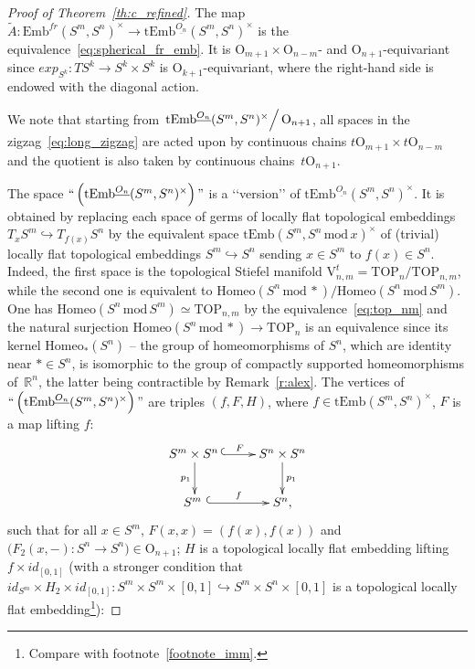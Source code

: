 \documentclass[11pt]{amsart}
\theoremstyle{definition}
\newcommand{\R}{{\mathbb R}}
\newcommand{\Embfr}{\mathrm{Emb}^{fr}}
\newcommand{\tEmb}{\mathrm{tEmb}}
\newcommand{\Homeo}{\mathrm{Homeo}}
\newcommand{\TOP}{\mathrm{TOP}}
\newcommand{\OO}{\mathrm{O}}
\newcommand{\VV}{\mathrm{V}}
\newcommand{\mmod}{\,\mathrm{mod}\,}
\numberwithin{equation}{section}
\begin{document}
\begin{proof}[Proof of Theorem~\ref{th:c_refined}]
The map $\tilde A\colon \Embfr(S^m,S^n)^\times\to \tEmb^{\underline{O_n}}(S^m,S^n)^\times$ is the equivalence~\eqref{eq:spherical_fr_emb}. It is $\OO_{m+1}\times\OO_{n-m}$- and $\OO_{n+1}$-equivariant since
$exp_{S^k}\colon TS^k\to S^k\times S^k$ is $\OO_{k+1}$-equivariant, where the right-hand side is endowed with the diagonal action. 

We note that starting from $\left.\tEmb^{\underline{O_n}}(S^m,S^n)^\times\right/\OO_{n+1}$, all spaces in the zigzag~\eqref{eq:long_zigzag} are acted upon by continuous chains $t\OO_{m+1}\times t\OO_{n-m}$ and the quotient is also 
taken by continuous chains~$t\OO_{n+1}$.

The space $\text{\lq\lq{}}\left(\tEmb^{\underline{O_n}}(S^m,S^n)^\times\right)\text{\rq\rq{}}$ is a \lq\lq{}version\rq\rq{} of $\tEmb^{\underline{O_n}}(S^m,S^n)^\times$. It is obtained by replacing each space
of germs of locally flat topological embeddings $T_xS^m\hookrightarrow T_{f(x)}S^n$ by the equivalent space $\tEmb(S^m,S^n\mmod x)^\times$ of (trivial) locally flat topological embeddings $S^m\hookrightarrow S^n$ sending
$x\in S^m$ to $f(x)\in S^n$. Indeed, the first space is the topological Stiefel manifold $\VV_{n,m}^t=\TOP_n/\TOP_{n,m}$, while the second one is equivalent to $\Homeo(S^n\mmod *)/\Homeo(S^n\mmod S^m)$.
One has $\Homeo(S^n\mmod S^m)\simeq\TOP_{n,m}$ by the equivalence~\eqref{eq:top_nm} and the natural surjection $\Homeo(S^n\mmod *)\to\TOP_n$ is an equivalence since its kernel $\Homeo_*(S^n)$ -- 
the group of homeomorphisms of $S^n$, which are identity near $*\in S^n$, is isomorphic to the group of 
compactly supported homeomorphisms of~$\R^n$, the latter being contractible by Remark~\ref{r:alex}. The vertices of $\text{\lq\lq{}}\left(\tEmb^{\underline{O_n}}(S^m,S^n)^\times\right)\text{\rq\rq{}}$ are triples
$(f,F,H)$, where $f\in \tEmb(S^m,S^n)^\times$, $F$ is a map lifting $f$:
\begin{equation}\label{eq:embfr_sq3}
\xymatrix{
S^m\times S^n\,\ar@{^{(}->}[r]^-F \ar[d]_{p_1}& S^n\times S^n\ar[d]^{p_1}\\
S^m\,\,\ar@{^{(}->}[r]^f&S^n,
}
\end{equation}
such that for all $x\in S^m$,
 $F(x,x)=(f(x),f(x))$ %
  and $\bigl(F_2(x,-)\colon S^n\to S^n\bigr)\in\OO_{n+1}$; 
  $H$ is
a topological locally flat embedding lifting $f\times id_{[0,1]}$ (with a stronger condition that $id_{S^m}\times H_2\times id_{[0,1]}\colon S^m\times S^m\times [0,1]\hookrightarrow S^m\times S^n\times [0,1]$ is a topological locally flat embedding\footnote{Compare with footnote~\ref{footnote_imm}.}):

\end{proof}
\end{document}
